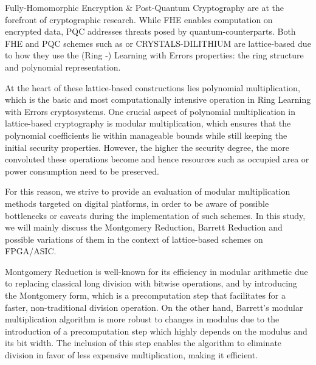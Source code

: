 \documentclass[11pt,
  titlepage=false,
  abstract=on,
]{scrreprt}
\begin{document}
Fully-Homomorphic Encryption \& Post-Quantum Cryptography are at the forefront of cryptographic research. While FHE enables computation on encrypted data, PQC
addresses threats posed by quantum-counterparts. Both FHE and PQC schemes such as \cite{gursoy2022privacy} or CRYSTALS-DILITHIUM \cite{soni2021crystals} are 
lattice-based due to how they use the (Ring -) Learning with Errors properties: the ring structure and polynomial representation. 

At the heart of these lattice-based constructions lies polynomial multiplication, which is the basic and most computationally intensive operation in Ring Learning 
with Errors cryptosystems. One crucial aspect of polynomial multiplication in lattice-based cryptography is modular multiplication, which 
ensures that the polynomial coefficients lie within manageable bounds while still keeping the initial security properties. However, the higher the security 
degree, the more convoluted these operations become and hence resources such as occupied area or power consumption need to be preserved.

For this reason, we strive to provide an evaluation of modular multiplication methods targeted on digital platforms, in order to be aware of possible bottlenecks 
or caveats during the implementation of such schemes. In this study, we will mainly discuss the Montgomery Reduction, Barrett Reduction and possible variations of them
in the context of lattice-based schemes on FPGA/ASIC.


Montgomery Reduction \cite{montgomery1985modular} is well-known for its efficiency in modular arithmetic due to replacing classical long division with bitwise operations, and by introducing the Montgomery form,
which is a precomputation step that facilitates for a faster, non-traditional division operation.
On the other hand, Barrett's modular multiplication algorithm \cite{barrett1986implementing} is more robust to changes in modulus due to the introduction of a precomputation step which highly depends on the modulus and
its bit width. The inclusion of this step enables the algorithm to eliminate division in favor of less expensive multiplication, making it efficient.

\end{document}
